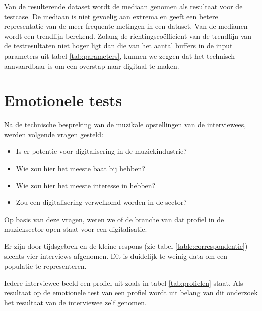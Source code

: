Van de resulterende dataset wordt de mediaan genomen als resultaat voor de testcase. De mediaan is niet gevoelig aan extrema en geeft een betere representatie van de meer frequente metingen in een dataset. \autocite{median} Van de medianen wordt een trendlijn berekend. Zolang de richtingscoëfficient van de trendlijn van de testresultaten niet hoger ligt dan die van het aantal buffers in de input parameters uit tabel \ref{tab:parameters}, kunnen we zeggen dat het technisch aanvaardbaar is om een overstap naar digitaal te maken. 

\section{Emotionele tests}
\label{sec:methodologie:emotioneletests}

Na de technische bespreking van de muzikale opstellingen van de interviewees, werden volgende vragen gesteld:

\begin{itemize}
	\item Is er potentie voor digitalisering in de muziekindustrie?
	\item Wie zou hier het meeste baat bij hebben?
	\item Wie zou hier het meeste interesse in hebben?
	\item Zou een digitalisering verwelkomd worden in de sector?
\end{itemize}

Op basis van deze vragen, weten we of de branche van dat profiel in de muzieksector open staat voor een digitalisatie.

Er zijn door tijdsgebrek en de kleine respons (zie tabel \ref{table:correspondentie}) slechts vier interviews afgenomen. Dit is duidelijk te weinig data om een populatie te representeren.

Iedere interviewee beeld een profiel uit zoals in tabel \ref{tab:profielen} staat. Als resultaat op de emotionele test van een profiel wordt uit belang van dit onderzoek het resultaat van de interviewee zelf genomen.

